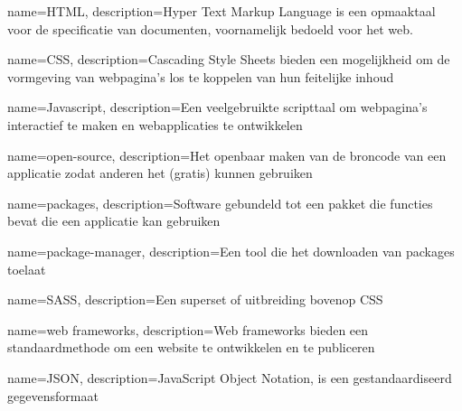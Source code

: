 

\makeglossaries

{
    name=HTML,
    description={Hyper Text Markup Language is een opmaaktaal voor de specificatie van documenten, voornamelijk bedoeld voor het web.}
}

{
    name=CSS,
    description={Cascading Style Sheets bieden een mogelijkheid om de vormgeving van webpagina's los te koppelen van hun feitelijke inhoud}
}

{
    name=Javascript,
    description={Een veelgebruikte scripttaal om webpagina's interactief te maken en webapplicaties te ontwikkelen}
}

{
    name=open-source,
    description={Het openbaar maken van de broncode van een applicatie zodat anderen het (gratis) kunnen gebruiken}
}

{
    name=packages,
    description={Software gebundeld tot een pakket die functies bevat die een applicatie kan gebruiken}
}

{
    name=package-manager,
    description={Een tool die het downloaden van packages toelaat}
}

{
    name=SASS,
    description={Een superset of uitbreiding bovenop CSS}
}

{
    name=web frameworks,
    description={Web frameworks bieden een standaardmethode om een website te ontwikkelen en te publiceren}
}

{
    name=JSON,
    description={JavaScript Object Notation, is een gestandaardiseerd gegevensformaat}
}